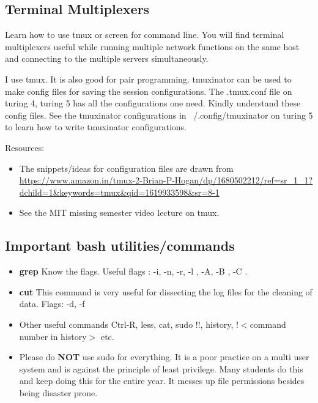 \documentclass{article}
\begin{document}
\subsection{Terminal Multiplexers}
Learn how to use tmux or screen for command line. You will find terminal multiplexers useful while running multiple network functions on the same host and connecting to the multiple servers simultaneously.

I use tmux. It is also good for pair programming. tmuxinator can be used to make config files for saving the session configurations. The .tmux.conf file on turing 4, turing 5 has all the configurations one need. Kindly understand these config files. See the tmuxinator configurations in ~/.config/tmuxinator on turing 5 to learn how to write tmuxinator configurations.

Resources:
\begin{itemize}
    \item The snippets/ideas for configuration files are drawn from \url{https://www.amazon.in/tmux-2-Brian-P-Hogan/dp/1680502212/ref=sr_1_1?dchild=1&keywords=tmux&qid=1619933598&sr=8-1}
    \item See the MIT missing semester video lecture on tmux.
\end{itemize}
\subsection{Important bash utilities/commands}
\begin{itemize}
    \item \textbf{grep} Know the flags. Useful flags : -i, -n, -r, -l , -A, -B , -C .
    \item \textbf{cut} This command is very useful for dissecting the log files for the cleaning of data. Flags: -d, -f
    \item{Other useful commands} Ctrl-R, less, cat, sudo !!, history, !$<$command number in history$>$  etc.
    \item Please do \textbf{NOT} use sudo for everything. It is a poor practice on a multi user system and is against the principle of least privilege. Many students do this and keep doing this for the entire year. It messes up file permissions besides being disaster prone.
\end{itemize}
\end{document}
